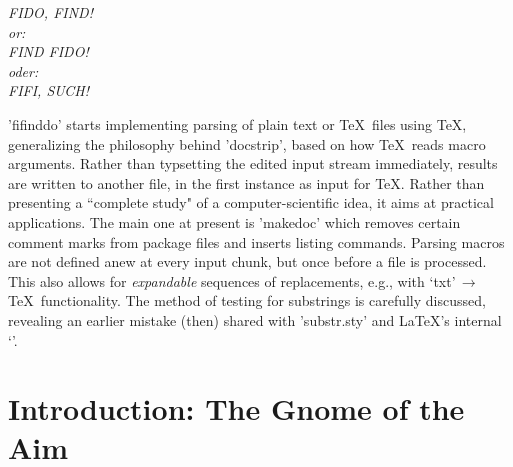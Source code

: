 \documentclass[fleqn]{article}
\begin{document}
\maketitle

\begin{flushright}\small\it FIDO, FIND!\\or:\\FIND FIDO!\\oder:\\FIFI, 
                            SUCH!\end{flushright} 
\begin{MDabstract}
'fifinddo' starts implementing parsing of plain text or \TeX\ files 
using \TeX, generalizing the philosophy behind 'docstrip', 
based on how \TeX\ reads macro arguments. 
Rather than typsetting the edited input stream immediately, 
results are written to another file, 
in the first instance as input for \TeX.
Rather than presenting a ``complete study" of a computer-scientific 
idea, it aims at practical applications. 
The main one at present is '\mbox{makedoc}' which removes certain comment 
marks from package files and inserts listing commands. 
Parsing macros are not defined anew at every input chunk, 
but once before a file is processed. 
This also allows for \emph{expandable} sequences of replacements, 
e.g., with `txt'\,$\to$\,\TeX\ functionality. 
The method of testing for substrings is carefully discussed,
revealing an earlier mistake (then) shared with 'substr.sty' 
and \LaTeX's internal `\in@'. 
\end{MDabstract}
\tableofcontents

\pagebreak                                      %
\section{Introduction: The Gnome of the Aim} 
\end{document}
